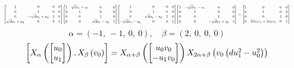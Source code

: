 \documentclass[11pt]{article}
\theoremstyle{definition}
\begin{document}
\[
\scaletoalign{\textwidth}{{\left[\begin{matrix}1 & 0 & 0 & 0\\0 & 1 & 0 & 0\\0 & - \sqrt{d} u_{1} + u_{0} & 1 & 0\\\sqrt{d} u_{1} + u_{0} & 0 & 0 & 1\end{matrix}\right]} {\left[\begin{matrix}1 & \sqrt{d} v_{1} + v_{0} & 0 & 0\\0 & 1 & 0 & 0\\0 & 0 & 1 & 0\\0 & 0 & \sqrt{d} v_{1} - v_{0} & 1\end{matrix}\right]} {\left[\begin{matrix}1 & 0 & 0 & 0\\0 & 1 & 0 & 0\\0 & \sqrt{d} u_{1} - u_{0} & 1 & 0\\- \sqrt{d} u_{1} - u_{0} & 0 & 0 & 1\end{matrix}\right]} {\left[\begin{matrix}1 & - \sqrt{d} v_{1} - v_{0} & 0 & 0\\0 & 1 & 0 & 0\\0 & 0 & 1 & 0\\0 & 0 & - \sqrt{d} v_{1} + v_{0} & 1\end{matrix}\right]} = {\left[\begin{matrix}1 & 0 & 0 & 0\\0 & 1 & 0 & 0\\0 & 0 & 1 & 0\\0 & 2 d u_{1} v_{1} + 2 u_{0} v_{0} & 0 & 1\end{matrix}\right]}}
\]
\[
\alpha = \left( -1, \  -1, \  0, \  0\right), \quad \beta = \left( 2, \  0, \  0, \  0\right)
\]
\[
\scaletoalign{\textwidth}{\left[ X_{\alpha}\left(\left[\begin{matrix}u_{0}\\u_{1}\end{matrix}\right]\right), X_{\beta}\left(v_{0}\right) \right] = X_{\alpha + \beta}\left(\left[\begin{matrix}u_{0} v_{0}\\- u_{1} v_{0}\end{matrix}\right]\right) X_{2\alpha + \beta}\left(v_{0} \left(d u_{1}^{2} - u_{0}^{2}\right)\right)}
\]
\end{document}

